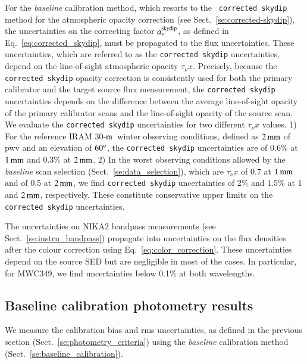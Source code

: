 \documentclass[traditionalabstract]{aa}
\newcommand{\trentemetre}{30-$\rm{m}$}
\newcommand{\taunu}{\tau_{\nu}}
\begin{document}
{For the \emph{baseline} calibration method, which resorts to the {\tt
corrected skydip} method for the atmospheric opacity correction (see
Sect.~\ref{se:corrected-skydip}), the uncertainties on the
correcting factor $a_\nu^{\rm{skydip}}$, as defined in
Eq.~\ref{eq:corrected_skydip}, must be propagated to the flux
uncertainties. These uncertainties, which are referred to as the
{\tt corrected skydip} uncertainties, depend on the line-of-sight atmospheric
opacity $\taunu x$. Precisely, because the {\tt corrected skydip}
opacity correction is consistently used for both the primary
calibrator and the target source flux measurement, the {\tt corrected skydip}
uncertainties depends on the difference between the average
line-of-sight opacity of the primary calibrator scans and the
line-of-sight opacity of the source scan.   
We evaluate the {\tt corrected skydip} uncertainties for two
different $\taunu x$ values. 1) For the reference IRAM \trentemetre\
winter observing conditions, defined as $2\,\rm{mm}$ of pwv and an
elevation of $60^{\rm{o}}$, the {\tt corrected skydip} uncertainties are of
0.6\% at $1\,\rm{mm}$ and 0.3\% at $2\,\rm{mm}$. 2) In the worst
observing conditions allowed by the \emph{baseline} scan selection
(Sect.~\ref{se:data_selection}),
which are $\taunu x$ of 0.7 at $1\,\rm{mm}$ and of 0.5 at
$2\,\rm{mm}$, we find {\tt corrected skydip} uncertainties of 2\% and
$1.5\%$ at 1 and $2\,\rm{mm}$, respectively. These constitute
conservative upper limits on the {\tt corrected skydip}
uncertainties.

The uncertainties on NIKA2 bandpass measurements (see
Sect.~\ref{se:instru_bandpass}) propagate into
uncertainties on the flux densities after the colour correction using
Eq.~\ref{eq:color_correction}. These
uncertainties depend on the source SED but are negligible in most of
the cases. In particular, for MWC349, we find uncertainties below 0.1\% at
both wavelengths.}


\subsection{Baseline calibration photometry results}
\label{se:photometry_baseline}

We measure the calibration bias and rms uncertainties, as defined
in the previous section (Sect.~\ref{se:photometry_criteria}) using the
\emph{baseline} calibration method (Sect.~\ref{se:baseline_calibration}).
\end{document}
